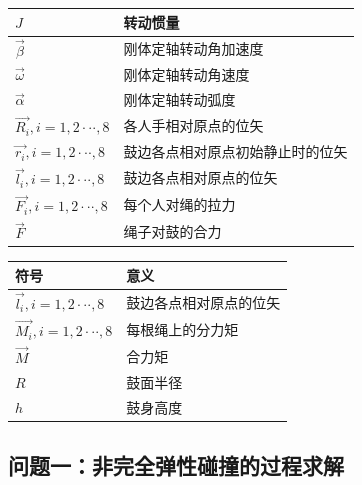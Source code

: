 \documentclass[UTF8]{article}
\begin{document}
\begin{center}
\begin{table}[h]
\begin{tabular}{p{3cm}<{\centering}|p{7cm}<{\centering}}
            \hline
            $J$&转动惯量\\
            \hline
            $\overrightarrow{\beta}$&刚体定轴转动角加速度\\
            \hline
            $\overrightarrow{\omega}$&刚体定轴转动角速度\\
            \hline
            $\overrightarrow{\alpha}$&刚体定轴转动弧度\\
            \hline
            $\overrightarrow{R_i},i=1,2···,8$&各人手相对原点的位矢\\
            \hline
            $\overrightarrow{r_i},i=1,2···,8$&鼓边各点相对原点初始静止时的位矢\\
            \hline
            $\overrightarrow{l_i},i=1,2···,8$&鼓边各点相对原点的位矢\\
 
            \hline
            $\overrightarrow{F_i},i=1,2···,8$&每个人对绳的拉力\\
            \hline
            $\overrightarrow{F}$&绳子对鼓的合力\\
            \bottomrule 
        \end{tabular}  
    \end{table}  
\end{center}
\begin{center}
    \begin{table}[h]
        \centering
        \begin{tabular}{p{3cm}<{\centering}|p{7cm}<{\centering}} %
            \toprule 
            符号&意义\\
            \hline
            $\overrightarrow{l_i},i=1,2···,8$&鼓边各点相对原点的位矢\\
            \hline
            $\overrightarrow{M_i},i=1,2···,8$&每根绳上的分力矩\\
            \hline
            $\overrightarrow{M}$&合力矩\\
            \hline
            $R$&鼓面半径\\
            \hline
            $h$&鼓身高度\\ 
            \bottomrule 
        \end{tabular}  
    \end{table}  
\end{center}



\begin{center}
    \section{问题一：非完全弹性碰撞的过程求解}  
\end{center}
\end{document}

